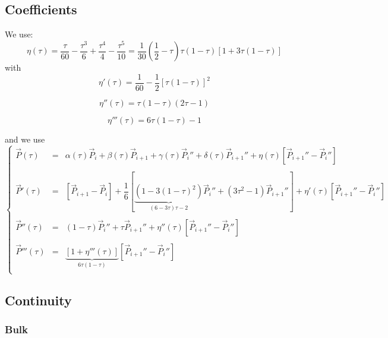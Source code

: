 \documentclass[aps,12pt]{revtex4}
\begin{document}
\subsection{Coefficients}
We use:
\begin{equation}
	\eta(\tau) = \dfrac{\tau}{60} - \dfrac{\tau^3}{6} + \dfrac{\tau^4}{4} - \dfrac{\tau^5}{10}
	 = \dfrac{1}{30} \left(\dfrac{1}{2} - \tau \right)\tau (1-\tau) \left[ 1 + 3 \tau(1-\tau) \right]
\end{equation}
with
\begin{equation}
\eta'(\tau) = \dfrac{1}{60} - \dfrac{1}{2} \left[ \tau(1-\tau) \right]^2
\end{equation}

\begin{equation}
\eta''(\tau) =  \tau(1-\tau)(2\tau-1)
\end{equation}

\begin{equation}
\eta'''(\tau) =  6\tau(1-\tau)-1
\end{equation}

and we use
\begin{equation}
\left\lbrace
\begin{array}{rcl}
\vec{P}(\tau)  & = & \alpha(\tau)\vec{P}_i + \beta(\tau) \vec{P}_{i+1} + \gamma(\tau)\vec{P}_{i}'' + \delta(\tau) \vec{P}_{i+1}'' + \eta(\tau) \left[\vec{P}_{i+1}'' - \vec{P}_i''\right]\\
\\
\vec{P}'(\tau) & = & \left[\vec{P}_{i+1} - \vec{P}_i\right] + \dfrac{1}{6} \left[ \underbrace{(1-3(1-\tau)^2)}_{(6-3\tau)\tau-2} \vec{P}_{i}'' + (3\tau^2-1) \vec{P}_{i+1}'' \right] + \eta'(\tau) \left[\vec{P}_{i+1}'' - \vec{P}_i''\right]\\
\\
\vec{P}''(\tau) & = & (1-\tau) \vec{P}_{i}'' + \tau \vec{P}_{i+1}'' + \eta''(\tau) \left[\vec{P}_{i+1}'' - \vec{P}_i''\right]\\\
\\
\vec{P}'''(\tau) & = & \underbrace{\left[1+\eta'''(\tau)\right]}_{6\tau(1-\tau)} \left[\vec{P}_{i+1}'' - \vec{P}_i''\right]\\\
\end{array}
\right.
\end{equation}

\subsection{Continuity}

\subsubsection{Bulk}
\end{document}
